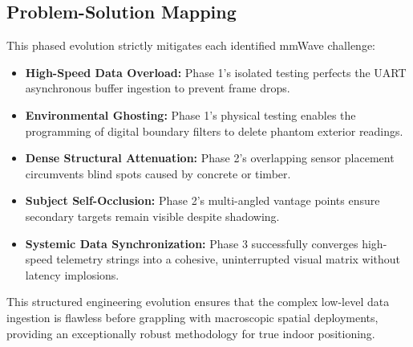 \subsection{Problem-Solution Mapping}
This phased evolution strictly mitigates each identified mmWave challenge:
\begin{itemize}
    \item \textbf{High-Speed Data Overload:} Phase 1's isolated testing perfects the UART asynchronous buffer ingestion to prevent frame drops.
    \item \textbf{Environmental Ghosting:} Phase 1's physical testing enables the programming of digital boundary filters to delete phantom exterior readings.
    \item \textbf{Dense Structural Attenuation:} Phase 2's overlapping sensor placement circumvents blind spots caused by concrete or timber.
    \item \textbf{Subject Self-Occlusion:} Phase 2's multi-angled vantage points ensure secondary targets remain visible despite shadowing.
    \item \textbf{Systemic Data Synchronization:} Phase 3 successfully converges high-speed telemetry strings into a cohesive, uninterrupted visual matrix without latency implosions.
\end{itemize}

This structured engineering evolution ensures that the complex low-level data ingestion is flawless before grappling with macroscopic spatial deployments, providing an exceptionally robust methodology for true indoor positioning.
